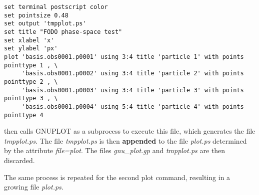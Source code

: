 {\footnotesize
\madhline
\begin{verbatim}
set terminal postscript color
set pointsize 0.48
set output 'tmpplot.ps'
set title "FODO phase-space test"
set xlabel 'x'
set ylabel 'px'
plot 'basis.obs0001.p0001' using 3:4 title 'particle 1' with points pointtype 1 , \
     'basis.obs0001.p0002' using 3:4 title 'particle 2' with points pointtype 2 , \
     'basis.obs0001.p0003' using 3:4 title 'particle 3' with points pointtype 3 , \
     'basis.obs0001.p0004' using 5:4 title 'particle 4' with points pointtype 4 
\end{verbatim}
\madhline
}

\madx then calls GNUPLOT as a subprocess to execute this file, which
generates the file \textit{tmpplot.ps}.  
The file \textit{tmpplot.ps} is then \textbf{appended} to the file
\textit{plot.ps} determined by the attribute \textit{file=plot}.  
The files \textit{gnu\_plot.gp} and \textit{tmpplot.ps} are then
discarded. 

The same process is repeated for the second plot command, resulting in a
growing file \textit{plot.ps}.





